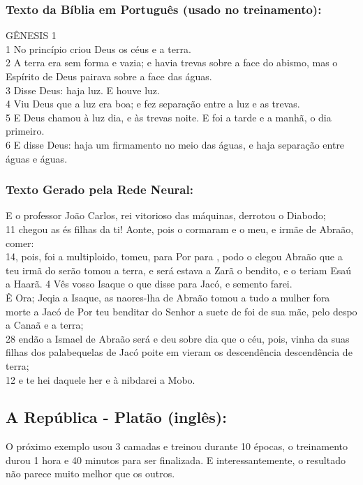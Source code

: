 \documentclass[a4paper,12pt]{article}
\begin{document}
\subsubsection*{\textbf{Texto da Bíblia em Português (usado no treinamento):}}
{
    GÊNESIS 1\\1 No princípio criou Deus os céus e a terra.\\
    2 A terra era sem forma e vazia; e havia trevas sobre a face do abismo, mas o Espírito de Deus pairava sobre a face das águas.\\
    3 Disse Deus: haja luz. E houve luz.\\
    4 Viu Deus que a luz era boa; e fez separação entre a luz e as trevas.\\
    5 E Deus chamou à luz dia, e às trevas noite. E foi a tarde e a manhã, o dia primeiro.\\ 
    6 E disse Deus: haja um firmamento no meio das águas, e haja separação entre águas e águas.
}

\subsubsection*{\textbf{Texto Gerado pela Rede Neural}:}
E o professor João Carlos, rei vitorioso das máquinas, derrotou o Diabodo;\\
11 chegou as és filhas da ti! Aonte, pois o cormaram e o meu, e irmãe de Abraão, comer:\\
14, pois, foi a multiploido, tomeu, para Por para , podo o clegou Abraão que a teu irmã do serão tomou a terra, e será estava a Zarã o bendito, e o teriam Esaú a Haarã.
4 Vês vosso Isaque o que disse para Jacó, e semento farei.\\
Ê Ora; Jeqia a Isaque, as naores-lha de Abraão tomou a tudo a mulher fora morte a Jacó de Por teu benditar do Senhor a suete de foi de sua mãe, pelo despo a Canaã e a terra;\\
28 endão a Ismael de Abraão será  e deu sobre dia que o céu, pois, vinha da suas filhas dos palabequelas de Jacó poite em vieram os descendência descendência de terra;\\
12 e te hei daquele her e à nibdarei a Mobo.

\subsection{A República - Platão (inglês):}
O próximo exemplo usou 3 camadas e treinou durante 10 épocas, o treinamento durou 1 hora e 40 minutos para ser finalizada. E interessantemente,
o resultado não parece muito melhor que os outros.
\end{document}
